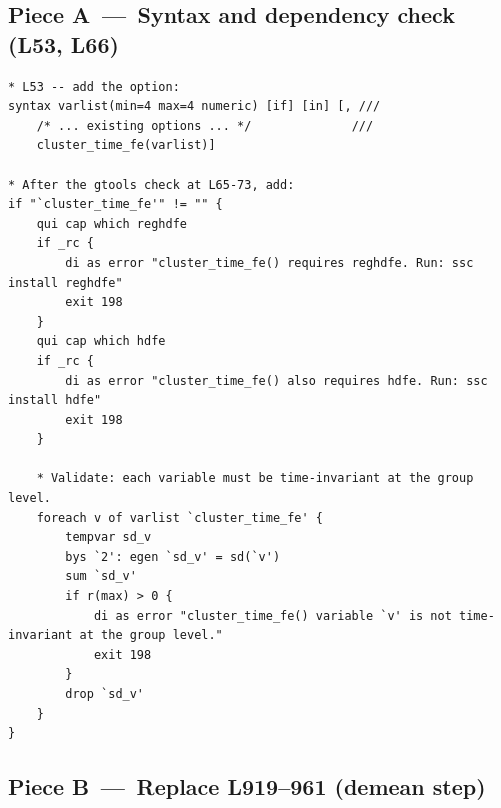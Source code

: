 \documentclass[11pt]{article}
\newcommand{\1}{\mathbb{1}}
\begin{document}
\subsection*{Piece A \,---\, Syntax and dependency check (L53, L66)}

\begin{lstlisting}
* L53 -- add the option:
syntax varlist(min=4 max=4 numeric) [if] [in] [, ///
    /* ... existing options ... */              ///
    cluster_time_fe(varlist)]

* After the gtools check at L65-73, add:
if "`cluster_time_fe'" != "" {
    qui cap which reghdfe
    if _rc {
        di as error "cluster_time_fe() requires reghdfe. Run: ssc install reghdfe"
        exit 198
    }
    qui cap which hdfe
    if _rc {
        di as error "cluster_time_fe() also requires hdfe. Run: ssc install hdfe"
        exit 198
    }

    * Validate: each variable must be time-invariant at the group level.
    foreach v of varlist `cluster_time_fe' {
        tempvar sd_v
        bys `2': egen `sd_v' = sd(`v')
        sum `sd_v'
        if r(max) > 0 {
            di as error "cluster_time_fe() variable `v' is not time-invariant at the group level."
            exit 198
        }
        drop `sd_v'
    }
}
\end{lstlisting}

\subsection*{Piece B \,---\, Replace L919--961 (demean step)}
\end{document}
